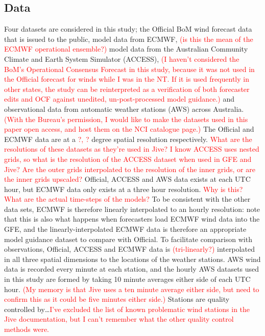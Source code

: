 \documentclass{ametsoc}
\begin{document}
\subsection{Data} 
Four datasets are considered in this study; the Official BoM wind forecast data that is issued to the public, model data from ECMWF, \textcolor{red}{(is this the mean of the ECMWF operational ensemble?)} model data from the Australian Community Climate and Earth System Simulator (ACCESS), \textcolor{red}{(I haven't considered the BoM's Operational Consensus Forecast in this study, because it was not used in the Official forecast for winds while I was in the NT. If it is used frequently in other states, the study can be reinterpreted as a verification of both forecaster edits and OCF against unedited, un-post-processed model guidance.)} and observational data from automatic weather stations (AWS) across Australia. \textcolor{red}{(With the Bureau's permission, I would like to make the datasets used in this paper open access, and host them on the NCI catalogue page.)} The Official and ECMWF data are at a \textcolor{red}{?, ?} degree spatial resolution respectively. \textcolor{red}{What are the resolutions of these datasets as they're used in Jive? I know ACCESS uses nested grids, so what is the resolution of the ACCESS dataset when used in GFE and Jive? Are the outer grids interpolated to the resolution of the inner grids, or are the inner grids upscaled?} Official, ACCESS and AWS data exists at each UTC hour, but ECMWF data only exists at a three hour resolution. \textcolor{red}{Why is this? What are the actual time-steps of the models?} To be consistent with the other data sets, ECMWF is therefore linearly interpolated to an hourly resolution: note that this is also what happens when forecasters load ECMWF wind data into the GFE, and the linearly-interpolated ECMWF data is therefore an appropriate model guidance dataset to compare with Official. To facilitate comparison with observations, Official, ACCESS and ECMWF data is \textcolor{red}{(tri-linearly?)} interpolated in all three spatial dimensions to the locations of the weather stations. AWS wind data is recorded every minute at each station, and the hourly AWS datasets used in this study are formed by taking 10 minute averages either side of each UTC hour. \textcolor{red}{(My memory is that Jive uses a ten minute average either side, but need to confirm this as it could be five minutes either side.)} Stations are quality controlled by\ldots \textcolor{red}{I've excluded the list of known problematic wind stations in the Jive documentation, but I can't remember what the other quality control methods were.}
\end{document}
